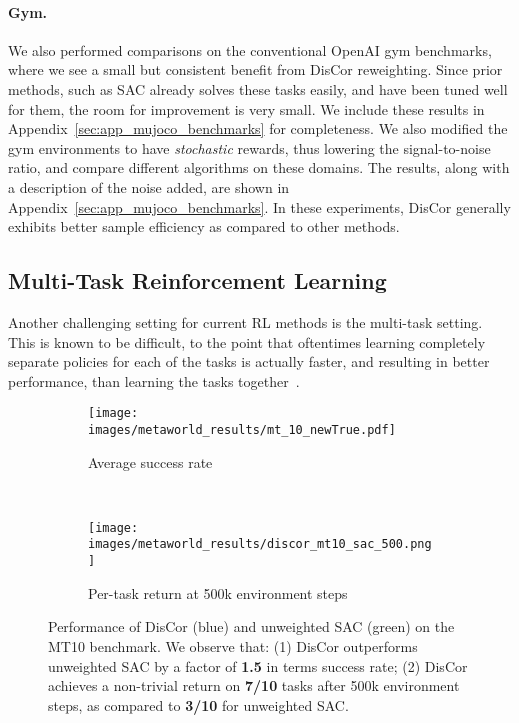 \documentclass[jmlr]{article}
\begin{document}
\paragraph{Gym.} We also performed comparisons on the conventional OpenAI gym benchmarks, where we see a small but consistent benefit from DisCor reweighting. Since prior methods, such as SAC already solves these tasks easily, and have been tuned well for them, the room for improvement is very small. We include these results in Appendix~\ref{sec:app_mujoco_benchmarks} for completeness. We also modified the gym environments to have \textit{stochastic} rewards, thus lowering the signal-to-noise ratio, and compare different algorithms on these domains. The results, along with a description of the noise added, are shown in Appendix~\ref{sec:app_mujoco_benchmarks}. In these experiments, DisCor generally exhibits better sample efficiency as compared to other methods.

\vspace{-2pt}
\subsection{Multi-Task Reinforcement Learning}
\label{sec:multi-task}
\vspace{-2pt}
Another challenging setting for current RL methods is the multi-task setting. This is known to be difficult, to the point that oftentimes learning completely separate policies for each of the tasks is actually faster, and resulting in better performance, than learning the tasks together~\citep{yu2019meta,schaul2019ray}. 

\begin{figure}[h]
    \centering
    \begin{subfigure}[t]{.4\linewidth}
        \centering
        \texttt{[image: images/metaworld\_results/mt\_10\_newTrue.pdf]}
        \caption{\footnotesize{Average success rate}}
    \end{subfigure}
    ~
    \begin{subfigure}[t]{.4\linewidth}
        \centering
        \texttt{[image: images/metaworld\_results/discor\_mt10\_sac\_500.png]}
        \caption{\footnotesize{Per-task return at 500k environment steps}} 
    \end{subfigure}
    \caption{\footnotesize{Performance of DisCor (blue) and unweighted SAC (green) on the MT10 benchmark. We observe that: (1) DisCor outperforms unweighted SAC by a factor of \textbf{1.5} in terms success rate; (2) DisCor achieves a non-trivial return on \textbf{7/10} tasks after 500k environment steps, as compared to \textbf{3/10} for unweighted SAC.}}
    \label{fig:mt_results}
\end{figure}
\end{document}
